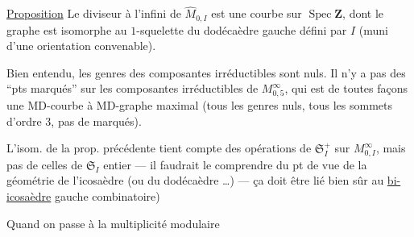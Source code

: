 \uline{Proposition} Le diviseur à l'infini  de $\widehat M_{0,I}$ est une courbe   sur $\operatorname{Spec}\mathbf Z$, dont le graphe est isomorphe au  $1$-squelette du dodécaèdre gauche défini par $I$ (muni d'une orientation convenable).

Bien entendu, les genres des composantes irréductibles sont nuls. Il n'y a pas  des ``pts marqués'' sur  les  composantes irréductibles de $M^\infty_{0,5}$, qui est de toutes façons une MD-courbe  à MD-graphe maximal (tous les genres nuls, tous les sommets d'ordre $3$, pas de  marqués).

L'isom. de la prop. précédente tient compte des opérations de $\mathfrak S_I^+$  sur $M^\infty_{0,I}$, mais pas de celles de $\mathfrak S_I$  entier --- il faudrait le comprendre du pt de vue de la géométrie de l'icosaèdre  (ou du dodécaèdre \ldots) --- ça doit être lié bien sûr au \uline{bi-icosaèdre} gauche combinatoire)

Quand on passe à la multiplicité modulaire
